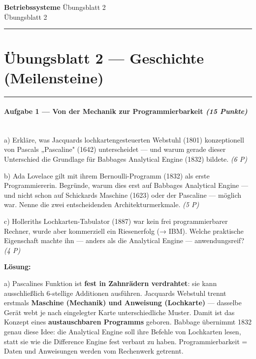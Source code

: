 \documentclass[11pt, a4paper]{article}
\providecommand{\nichttitle}{Übungsblatt}
\providecommand{\nichtsubtitle}{}
\renewcommand{\nichttitle}{Betriebssysteme}
\renewcommand{\nichtsubtitle}{Übungsblatt 2}
\begin{document}
\begin{center}
{\Large\bfseries\color{accent}\nichttitle}
\ifx\nichtsubtitle\empty\else
  \\[2pt]{\normalsize\color{accent!80!black}\nichtsubtitle}
\fi
\\[2pt]
\color{accent}\rule{0.4\linewidth}{0.8pt}\color{black}
\end{center}
\vspace{4pt}


\section{Übungsblatt 2 — Geschichte (Meilensteine)}


\noindent\textcolor{rulegray}{\rule{\linewidth}{0.4pt}}


\paragraph{Aufgabe 1 — Von der Mechanik zur Programmierbarkeit \textit{(15 Punkte)}}\mbox{}\\[2pt]

a) Erkläre, was Jacquards lochkartengesteuerten Webstuhl (1801) konzeptionell von Pascals „Pascaline" (1642) unterscheidet — und warum gerade dieser Unterschied die Grundlage für Babbages Analytical Engine (1832) bildete. \textit{(6 P)}


b) Ada Lovelace gilt mit ihrem Bernoulli-Programm (1832) als erste Programmiererin. Begründe, warum dies erst auf Babbages Analytical Engine — und nicht schon auf Schickards Maschine (1623) oder der Pascaline — möglich war. Nenne die zwei entscheidenden Architekturmerkmale. \textit{(5 P)}


c) Holleriths Lochkarten-Tabulator (1887) war kein frei programmierbarer Rechner, wurde aber kommerziell ein Riesenerfolg (→ IBM). Welche praktische Eigenschaft machte ihn — anders als die Analytical Engine — anwendungsreif? \textit{(4 P)}


\textbf{Lösung:}


a) Pascalines Funktion ist \textbf{fest in Zahnrädern verdrahtet}: sie kann ausschließlich 6-stellige Additionen ausführen. Jacquards Webstuhl trennt erstmals \textbf{Maschine (Mechanik) und Anweisung (Lochkarte)} — dasselbe Gerät webt je nach eingelegter Karte unterschiedliche Muster. Damit ist das Konzept eines \textbf{austauschbaren Programms} geboren. Babbage übernimmt 1832 genau diese Idee: die Analytical Engine soll ihre Befehle von Lochkarten lesen, statt sie wie die Difference Engine fest verbaut zu haben. Programmierbarkeit = Daten und Anweisungen werden vom Rechenwerk getrennt.
\end{document}
